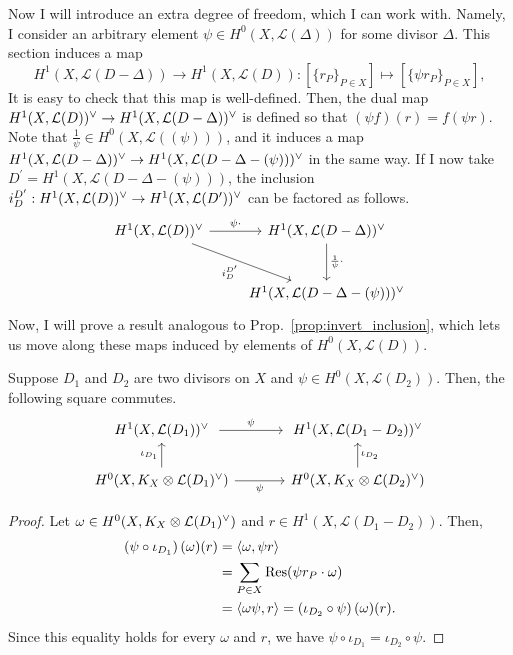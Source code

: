Now I will introduce an extra degree of freedom, which I can work with.
Namely, I consider an arbitrary element $\psi\in H^{0}(X,\mathcal{L}(\Delta))$
for some divisor $\Delta$. This section induces a map
\[H^{1}(X,\mathcal{L}(D-\Delta))\to H^{1}(X,\mathcal{L}(D))
:[\{r_{P}\}_{P\in X}]\mapsto [\{\psi r_{P}\}_{P\in X}],\]
It is easy to check that this map is well-defined. Then, the dual map
$H^1(X,\mathcal{L}(D))^{\vee}\to H^1(X,\mathcal{L}(D-\Delta))^{\vee}$ is defined so that $(\psi f)(r)
=f(\psi r)$. Note that $\frac1{\psi}\in H^{0}(X,\mathcal{L}((\psi)))$,
and it induces a map $H^1(X,\mathcal{L}(D-\Delta))^{\vee}\to H^1(X,\mathcal{L}(D-\Delta-(\psi)))^{\vee}$ in the same
way. If I now take $D^{\prime}=H^{1}(X,\mathcal{L}(D-\Delta-(\psi)))$,
the inclusion $i_{D}^{D^{\prime}}:H^1(X,\mathcal{L}(D))^{\vee}\to H^1(X,\mathcal{L}(D^{\prime}))^{\vee}$ can be
factored as follows.
\[\begin{tikzcd}[row sep=large]
    \dual{D}\rar["\psi\cdot"]\drar["i_{D}^{D^{\prime}}"']
    & \dual{D-\Delta}\dar["\frac1{\psi}\cdot"] \\ & \dual{D-\Delta-(\psi)}
  \end{tikzcd}\]
Now, I will prove a result analogous to Prop.~\ref{prop:invert_inclusion},
which lets us move along these maps induced by elements of
$H^{0}(X,\mathcal{L}(D))$.
\begin{prop}\label{prop:invert_multiplication}
  Suppose $D_{1}$ and $D_{2}$ are two divisors on $X$ and $\psi
  \in H^{0}(X,\mathcal{L}(D_{2}))$. Then, the following square commutes.
  \[\begin{tikzcd}[column sep=large]
      \dual{D_{1}}\rar[shorten=.3em,"\psi"] & \dual{D_{1}-D_{2}} \\
      \diffs{D_{1}}\rar["\psi"']\uar["\iota_{D_{1}}"]
      & \diffs{D_{2}}\uar["\iota_{D_{2}}"']
    \end{tikzcd}\]
\end{prop}
\begin{proof}
  Let $\omega\in H^0(X,K_X\otimes\mathcal{L}(D_{1})^{\vee})$ and $r\in H^{1}(X,\mathcal{L}(D_{1}-D_{2}))$.
  Then,
  \begin{align*}
    \left(\psi\circ\iota_{D_{1}}\right)(\omega)(r)
    &= \langle \omega, \psi r\rangle \\
    &= \sum_{P\in X}\operatorname{Res}(\psi r_{P}\cdot\omega) \\
    &= \langle \omega\psi, r\rangle=\left(\iota_{D_{2}}\circ\psi\right)
      (\omega)(r).
  \end{align*}
  Since this equality holds for every $\omega$ and $r$, we have
  $\psi\circ\iota_{D_{1}}=\iota_{D_{2}}\circ\psi$.
\end{proof}

